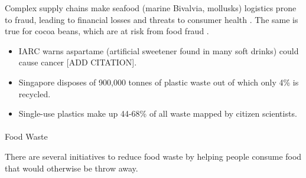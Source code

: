 \documentclass[
  letterpaper,
  DIV=11,
  numbers=noendperiod]{scrartcl}
\makeatletter
\let\oldparagraph\paragraph
\renewcommand{\paragraph}{
    \@ifstar
      \xxxParagraphStar
      \xxxParagraphNoStar
  }
\newcommand{\xxxParagraphStar}[1]{\oldparagraph*{#1}\mbox{}}
\newcommand{\xxxParagraphNoStar}[1]{\oldparagraph{#1}\mbox{}}
\providecommand{\tightlist}{%
  \setlength{\itemsep}{0pt}\setlength{\parskip}{0pt}}\usepackage{longtable,booktabs,array}
\makeatother
\begin{document}
Complex supply chains make seafood (marine Bivalvia, mollusks) logistics
prone to fraud, leading to financial losses and threats to consumer
health \citep{santosCurrentTrendsTraceability2023}. The same is true for
cocoa beans, which are at risk from food fraud
\citep{fanningLinkingCocoaQuality2023}.

\begin{itemize}
\tightlist
\item
  IARC warns aspartame (artificial sweetener found in many soft drinks)
  could cause cancer {[}ADD CITATION{]}.
\end{itemize}

\begin{itemize}
\tightlist
\item
  \citet{yapLifeCycleAssessment2023} Singapore disposes of 900,000
  tonnes of plastic waste out of which only 4\% is recycled.
\item
  \citet{kiesslingWhatPotentialDoes2023} Single-use plastics make up
  44-68\% of all waste mapped by citizen scientists.
\end{itemize}

\paragraph{Food Waste}\label{food-waste}

There are several initiatives to reduce food waste by helping people
consume food that would otherwise be throw away.
\end{document}
